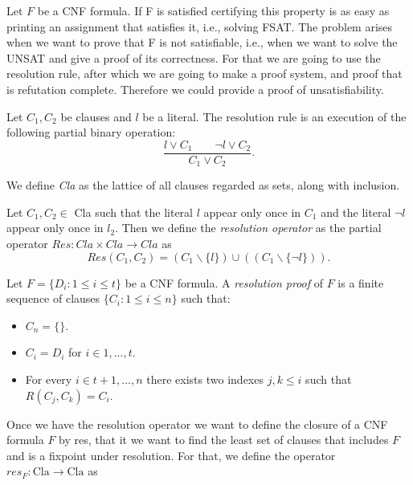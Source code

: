 Let $F$ be a CNF formula. If F is satisfied certifying this property is as easy as printing an assignment that satisfies it, i.e., solving FSAT. The problem arises when we want to prove that F is not satisfiable, i.e., when we want to solve the UNSAT and give a proof of its correctness. For that we are going to use the resolution rule, after which we are going to make a proof system, and proof that is refutation complete. Therefore we could provide a proof of unsatisfiability.

\begin{definition}
  Let $C_1,C_2$ be clauses and $l$ be a literal. The resolution rule is an execution of the following partial binary operation:
  $$\frac{l \lor C_1 \qquad \neg l \lor C_2}{ C_1 \lor C_2}.$$
\end{definition}

\begin{definition}
  
We define \emph{Cla} as the lattice of all clauses regarded as sets, along with inclusion. 
\end{definition}

\begin{definition}
 Let $C_1,C_2\in$ Cla  such that the literal $l$ appear only once in $C_1$ and the literal $\neg l$ appear only once in $l_2$. Then we define the \emph{resolution operator} as the partial operator $Res: Cla \times Cla \to Cla$ as
  $$Res(C_1,C_2) = (C_1 \backslash \{l\}) \cup ((C_1 \backslash \{\neg l\})).$$
\end{definition}

\begin{definition}
  Let $F = \{D_i : 1 \le i \le t\}$ be a CNF formula. A \emph{resolution proof} of $F$ is a finite sequence of clauses $\{C_i : 1\le i \le n\}$ such that:
  \begin{itemize}
  \item $C_n = \{\}$.
  \item $C_i  = D_i $ for $i\in 1,...,t$.
  \item For every $i\in t+1,...,n$ there exists two indexes $j,k\le i$ such that $R(C_j,C_k)  = C_i$.
  \end{itemize}
\end{definition}

Once we have  the resolution operator we want to define the closure of a CNF formula $F$ by res, that it we want to find the least set of clauses that includes $F$ and is a fixpoint under resolution. For that, we define the operator $res_F:\text{Cla}\to\text{Cla}$ as


